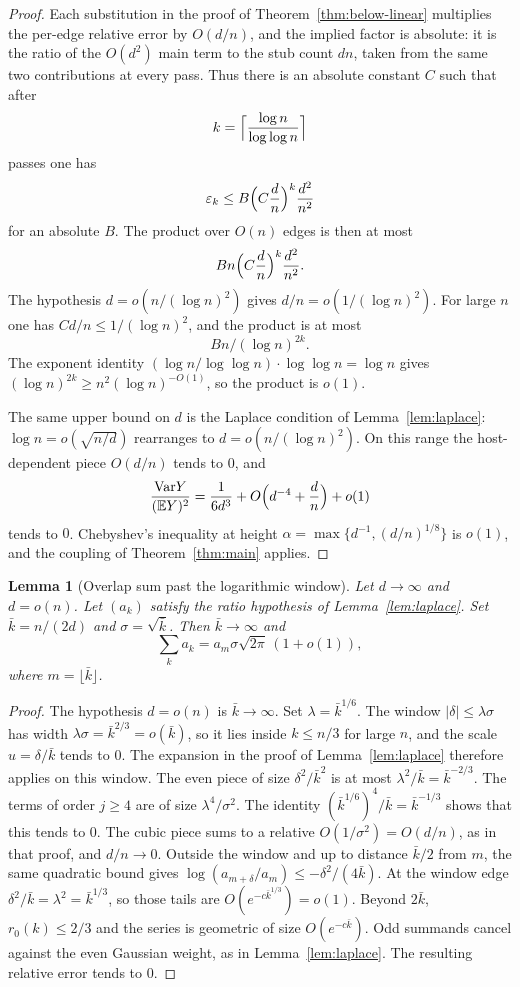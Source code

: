 \documentclass[11pt]{article}
\newtheorem{lemma}[theorem]{Lemma}
\newcommand{\EE}{\mathbb{E}}
\newcommand{\Var}{\mathrm{Var}}
\begin{document}
\begin{proof}
Each substitution in the proof of Theorem~\ref{thm:below-linear} multiplies the
per-edge relative error by \(O(d/n)\), and the implied factor is absolute: it is
the ratio of the \(O(d^2)\) main term to the stub count \(dn\), taken from the
same two contributions at every pass. Thus there is an absolute constant \(C\)
such that after
\[
k=\Bigl\lceil\frac{\log n}{\log\log n}\Bigr\rceil
\]
passes one has
\[
\varepsilon_k\le B\Bigl(C\frac{d}{n}\Bigr)^k\frac{d^2}{n^2}
\]
for an absolute \(B\). The product over \(O(n)\) edges is then at most
\[
Bn\Bigl(C\frac{d}{n}\Bigr)^k\frac{d^2}{n^2}.
\]
The hypothesis \(d=o(n/(\log n)^2)\) gives \(d/n=o(1/(\log n)^2)\). For large \(n\)
one has \(Cd/n\le 1/(\log n)^2\), and the product is at most
\[
Bn\big/(\log n)^{2k}.
\]
The exponent identity
\((\log n/\log\log n)\cdot\log\log n=\log n\) gives
\((\log n)^{2k}\ge n^{2}(\log n)^{-O(1)}\), so the product is \(o(1)\).

The same upper bound on \(d\) is the Laplace condition of Lemma~\ref{lem:laplace}:
\(\log n=o(\sqrt{n/d})\) rearranges to \(d=o(n/(\log n)^2)\). On this range the
host-dependent piece \(O(d/n)\) tends to \(0\), and
\[
\frac{\Var Y}{(\EE Y)^2}
=
\frac1{6d^3}+O\Bigl(d^{-4}+\frac{d}{n}\Bigr)+o(1)
\]
tends to \(0\). Chebyshev's inequality at height
\(\alpha=\max\{d^{-1},(d/n)^{1/8}\}\) is \(o(1)\), and the coupling of
Theorem~\ref{thm:main} applies.
\end{proof}

\begin{lemma}[Overlap sum past the logarithmic window]
\label{lem:overlap-wide}
Let \(d\to\infty\) and \(d=o(n)\). Let \((a_k)\) satisfy the ratio hypothesis of
Lemma~\ref{lem:laplace}. Set \(\bar k=n/(2d)\) and \(\sigma=\sqrt{\bar k}\). Then
\(\bar k\to\infty\) and
\[
\sum_k a_k
=
a_m\sigma\sqrt{2\pi}\,(1+o(1)),
\]
where \(m=\lfloor\bar k\rfloor\).
\end{lemma}

\begin{proof}
The hypothesis \(d=o(n)\) is \(\bar k\to\infty\). Set \(\lambda=\bar k^{1/6}\). The window
\(|\delta|\le\lambda\sigma\) has width \(\lambda\sigma=\bar k^{2/3}=o(\bar k)\), so it lies
inside \(k\le n/3\) for large \(n\), and the scale \(u=\delta/\bar k\) tends to \(0\).
The expansion in the proof of Lemma~\ref{lem:laplace} therefore applies on this window.
The even piece of size \(\delta^2/\bar k^2\) is at most \(\lambda^2/\bar k=\bar k^{-2/3}\).
The terms of order \(j\ge 4\) are of size \(\lambda^4/\sigma^2\). The identity
\((\bar k^{1/6})^4/\bar k=\bar k^{-1/3}\) shows that this tends to \(0\).
The cubic piece sums to a relative \(O(1/\sigma^2)=O(d/n)\), as in that proof, and
\(d/n\to 0\).
Outside the window and up to distance \(\bar k/2\) from \(m\), the same quadratic bound
gives \(\log(a_{m+\delta}/a_m)\le-\delta^2/(4\bar k)\). At the window edge
\(\delta^2/\bar k=\lambda^2=\bar k^{1/3}\), so those tails are
\(O(e^{-c\bar k^{1/3}})=o(1)\). Beyond \(2\bar k\), \(r_0(k)\le 2/3\) and the series is
geometric of size \(O(e^{-c\bar k})\).
Odd summands cancel against the even Gaussian weight, as in Lemma~\ref{lem:laplace}.
The resulting relative error tends to \(0\).
\end{proof}
\end{document}
